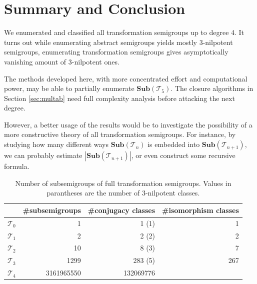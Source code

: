 \documentclass{amsart}
\newcommand{\cT}{{\mathcal T}}
\newcommand{\Sub}{\mathbf{Sub}}
\theoremstyle{plain}
\theoremstyle{definition}
\begin{document}
\section{Summary and Conclusion}
We enumerated and classified all transformation semigroups up to degree 4.
It turns out while enumerating abstract semigroups yields mostly 3-nilpotent semigroups, enumerating transformation semigroups gives asymptotically vanishing amount of 3-nilpotent ones.

The methods developed here, with more concentrated effort and computational power,  may be able to partially enumerate $\Sub(\cT_5)$.
The closure algorithms in Section \ref{sec:multab} need full complexity analysis before attacking the next degree. 

However, a better usage of the results would be to investigate the possibility of a more constructive theory of all transformation semigroups.
For instance, by studying how many different ways $\Sub(\cT_n)$ is embedded into $\Sub(\cT_{n+1})$, we can probably estimate $|\Sub(\cT_{n+1})|$, or even construct some recursive formula.
\begin{table}
\renewcommand{\arraystretch}{1}
\begin{tabular}{|c|r|r|r|}
\hline
 & \#subsemigroups & \#conjugacy classes & \#isomorphism classes \\
\hline
$\cT_0$ & 1  & 1 (1)& 1\\
\hline
$\cT_1$ & 2  & 2 (2)& 2\\
\hline
$\cT_2$ & 10  & 8 (3)& 7\\
\hline
$\cT_3$ & 1299 & 283 (5)& 267\\
\hline
$\cT_4$ & 3161965550 & 132069776 & \\
\hline
\end{tabular}
\caption{Number of subsemigroups of full transformation semigroups. Values in parantheses are the number of 3-nilpotent classes.}
\end{table}




\end{document}
